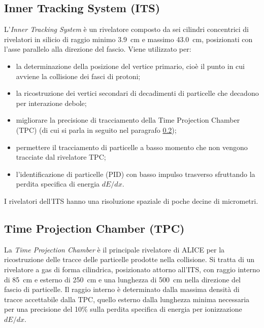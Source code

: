     \subsection{Inner Tracking System (ITS)} \label{ITS}
    L'\textit{Inner Tracking System} è un rivelatore composto da sei cilindri concentrici di rivelatori in silicio di raggio minimo 3.9~cm e massimo 43.0~cm, posizionati con l'asse parallelo alla direzione del fascio. Viene utilizzato per:
    \begin{itemize}
        \item la determinazione della posizione del vertice primario, cioè il punto in cui avviene la collisione dei fasci di protoni; 
        \item la ricostruzione dei vertici secondari di decadimenti di particelle che decadono per interazione debole; 
        \item migliorare la precisione di tracciamento della Time Projection Chamber (TPC) (di cui si parla in seguito nel paragrafo \ref{TPC});
        \item permettere il tracciamento di particelle a basso momento che non vengono tracciate dal rivelatore TPC;
        \item l'identificazione di particelle (PID) con basso impulso trasverso sfruttando la perdita specifica di energia $dE/dx$.
    \end{itemize}
    
    I rivelatori dell'ITS hanno una risoluzione spaziale di poche decine di micrometri. 
    
    \subsection{Time Projection Chamber  (TPC)} \label{TPC}
    La \textit{Time Projection Chamber}  è il principale rivelatore di ALICE per la ricostruzione delle tracce delle particelle prodotte nella collisione. Si tratta di un rivelatore a gas di forma cilindrica, posizionato attorno all'ITS, con raggio interno di 85~cm e esterno di 250~cm e una lunghezza di 500~cm nella direzione del fascio di particelle. Il raggio interno è determinato dalla massima densità di tracce accettabile dalla TPC, quello esterno dalla lunghezza minima necessaria per una precisione del 10$\%$ sulla perdita specifica di energia per ionizzazione $dE/dx$. 
     
